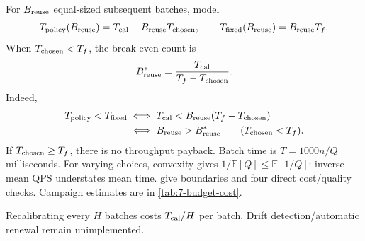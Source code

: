 For $B_{\rm reuse}$ equal-sized subsequent batches, model
\begin{equation}
 T_{\rm policy}(B_{\rm reuse})=T_{\rm cal}+B_{\rm reuse}T_{\rm chosen},\qquad
 T_{\rm fixed}(B_{\rm reuse})=B_{\rm reuse}T_f.
 \label{eq:6-total-cost}
\end{equation}
When $T_{\rm chosen}<T_f$, the break-even count is
\begin{equation}
 B_{\rm reuse}^*=\frac{T_{\rm cal}}{T_f-T_{\rm chosen}}.
 \label{eq:6-payback}
\end{equation}
Indeed,
\[
 \begin{aligned}
 T_{\rm policy}<T_{\rm fixed}
 &\iff T_{\rm cal}<B_{\rm reuse}(T_f-T_{\rm chosen})\\
 &\iff B_{\rm reuse}>B_{\rm reuse}^*
 \qquad(T_{\rm chosen}<T_f).
 \end{aligned}
\]
If $T_{\rm chosen}\geq T_f$, there is no throughput payback. Batch time is $T=1000n/Q$ milliseconds.
For varying choices, convexity gives $1/\mathbb E[Q]\leq\mathbb E[1/Q]$: inverse mean QPS understates mean time.  give boundaries and four direct cost/quality checks.
Campaign estimates are in \cref{tab:7-budget-cost}.

Recalibrating every $H$ batches costs $T_{\rm cal}/H$ per batch. Drift detection/automatic renewal remain unimplemented.